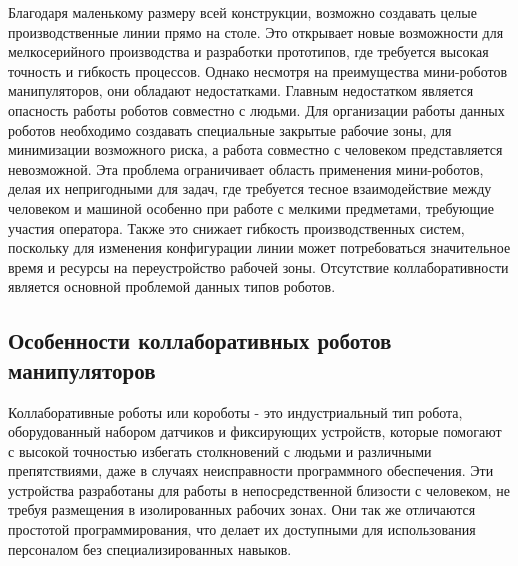 Благодаря маленькому размеру всей конструкции, возможно создавать целые производственные линии прямо на столе. Это открывает новые возможности для мелкосерийного производства и разработки прототипов, где требуется высокая точность и гибкость процессов. Однако несмотря на преимущества мини-роботов манипуляторов, они обладают недостатками. Главным недостатком является опасность работы роботов совместно с людьми. Для организации работы данных роботов необходимо создавать специальные закрытые рабочие зоны, для минимизации возможного риска, а работа совместно с человеком представляется невозможной.
Эта проблема ограничивает область применения мини-роботов, делая их непригодными для задач, где требуется тесное взаимодействие между человеком и машиной особенно при работе с мелкими предметами, требующие участия оператора. Также это снижает гибкость производственных систем, поскольку для изменения конфигурации линии может потребоваться значительное время и ресурсы на переустройство рабочей зоны. Отсутствие коллаборативности является основной проблемой данных типов роботов.


\subsection{Особенности коллаборативных роботов манипуляторов}

Коллаборативные роботы или короботы - это индустриальный тип робота, оборудованный набором датчиков и фиксирующих устройств, которые помогают с высокой точностью избегать столкновений с людьми и различными препятствиями, даже в случаях неисправности программного обеспечения. Эти устройства разработаны для работы в непосредственной близости с человеком, не требуя размещения в изолированных рабочих зонах. Они так же отличаются простотой программирования, что делает их доступными для использования персоналом без специализированных навыков.

